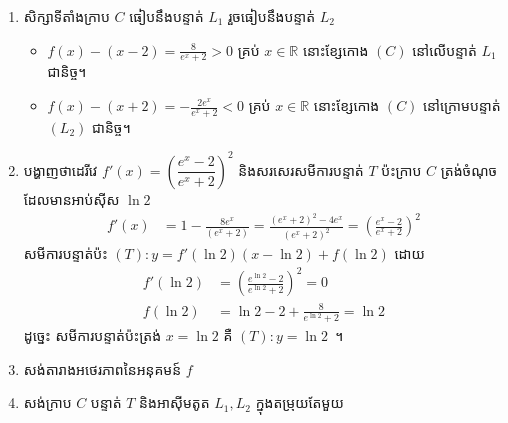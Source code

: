 \documentclass[11pt,a4paper]{myclass}
\begin{document}
\begin{enumerate}
\begin{enumerate}
			\item សិក្សាទីតាំងក្រាប $ C $ ធៀបនឹងបន្ទាត់ $ L_1 $ រួចធៀបនឹងបន្ទាត់ $ L_2 $
			\begin{itemize}
				\item $ f(x)-(x-2)=\frac{8}{e^x+2}>0 $ គ្រប់ $ x\in\mathbb{R} $ នោះខ្សែកោង $ (C) $ នៅលើបន្ទាត់ $ L_1 $ ជានិច្ច។
				\item $ f(x)-(x+2)=-\frac{2e^x}{e^x+2}<0 $ គ្រប់ $ x\in\mathbb{R} $ នោះខ្សែកោង $ (C) $ នៅក្រោមបន្ទាត់ $ (L_2) $ ជានិច្ច។
			\end{itemize}
			\item បង្ហាញថាដេរីវេ $ f'(x)=\left(\dfrac{e^x-2}{e^x+2}\right)^2 $ និងសរសេរសមីការបន្ទាត់ $ T $ ប៉ះក្រាប $ C $ ត្រង់ចំណុចដែលមានអាប់ស៊ីស $ \ln 2 $
			\begin{align*}
			f'(x) &= 1-\frac{8e^x}{(e^x+2)}=\frac{(e^x+2)^2-4e^x}{(e^x+2)^2}=\left( \frac{e^x-2}{e^x+2} \right)^2
			\end{align*}
			សមីការបន្ទាត់ប៉ះ $ (T):y=f'(\ln 2)(x-\ln 2)+f(\ln 2) $ ដោយ
			\begin{align*}
			f'(\ln 2) &=\left( \frac{e^{\ln 2}-2}{e^{\ln 2}+2} \right)^2=0\\
			f(\ln 2) &=\ln 2-2+\frac{8}{e^{\ln 2}+2}=\ln 2
			\end{align*}
			ដូច្នេះ សមីការបន្ទាត់ប៉ះត្រង់ $ x=\ln 2 $ គឺ $ (T):y=\ln 2 $~។
			\item សង់តារាងអថេរភាពនៃអនុគមន៍ $ f $
			\begin{figure}[H]
				\centering
			\end{figure}
			\item សង់ក្រាប $ C $ បន្ទាត់ $ T $ និងអាស៊ីមតូត $ L_1,L_2 $ ក្នុងតម្រុយតែមួយ
			\begin{figure}[H]
				\centering
\end{figure}
\end{enumerate}
\end{enumerate}
\end{document}
